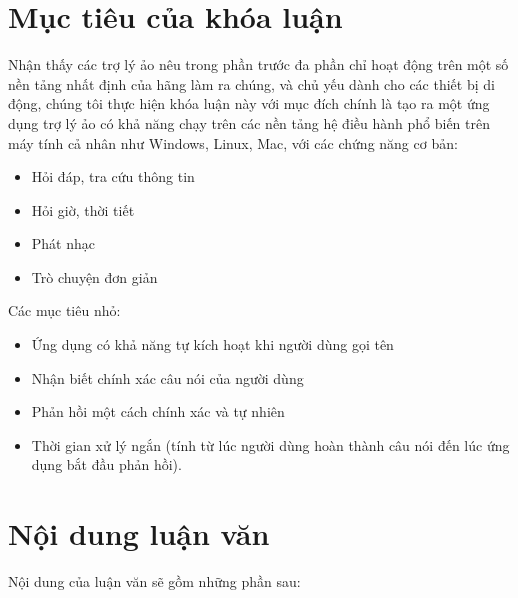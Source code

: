 \section{Mục tiêu của khóa luận}

Nhận thấy các trợ lý ảo nêu trong phần trước đa phần chỉ hoạt động trên một số nền tảng nhất định của hãng làm ra chúng, và chủ yếu dành cho các thiết bị di động, chúng tôi thực hiện khóa luận này với mục đích chính là tạo ra một ứng dụng trợ lý ảo có khả năng chạy trên các nền tảng hệ điều hành phổ biến trên máy tính cả nhân như Windows, Linux, Mac, với các chứng năng cơ bản:

\begin{itemize}
    \item Hỏi đáp, tra cứu thông tin
    \item Hỏi giờ, thời tiết
    \item Phát nhạc
    \item Trò chuyện đơn giản
\end{itemize}

Các mục tiêu nhỏ:

\begin{itemize}
    \item Ứng dụng có khả năng tự kích hoạt khi người dùng gọi tên
    \item Nhận biết chính xác câu nói của người dùng
    \item Phản hồi một cách chính xác và tự nhiên
    \item Thời gian xử lý ngắn (tính từ lúc người dùng hoàn thành câu nói đến lúc ứng dụng bắt đầu phản hồi).
\end{itemize}

\section{Nội dung luận văn}

Nội dung của luận văn sẽ gồm những phần sau:

